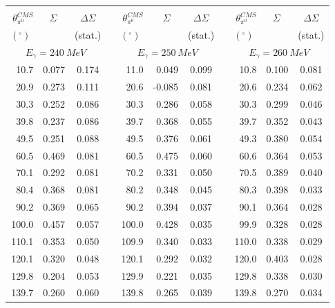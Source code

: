 \begin{table}[htbp] 
\begin{center} 
\begin{tabular}{|r|r|c|l|r|r|c|l|r|r|c|} 

\cline{1-3} 
\cline{5-7} 
\cline{9-11} 
& & & & & & & & & &\\ 
$\theta_{\pi^0}^{CMS}$ & 
$\Sigma\;\;\;$ & 
${\Delta}\Sigma$ & & 
$\theta_{\pi^0}^{CMS}$ & 
$\Sigma\;\;\;$ & 
${\Delta}\Sigma$ & & 
$\theta_{\pi^0}^{CMS}$ & 
$\Sigma\;\;\;$ & 
${\Delta}\Sigma$ \\ 
 $(^{\circ})\;$ & &(stat.) & & $(^{\circ})\;$ & &(stat.) & & $(^{\circ})\;$ & &(stat.) \\ 
\cline{1-3} 
\cline{5-7} 
\cline{9-11} 
\multicolumn{3}{|c|}{ $E_{\gamma}=240~MeV$} & & 
\multicolumn{3}{c|}{ $E_{\gamma}=250~MeV$} & & 
\multicolumn{3}{c|}{ $E_{\gamma}=260~MeV$} \\ 
\cline{1-3} 
\cline{5-7} 
\cline{9-11} 
 10.7 & 0.077 & 0.174 & &  11.0 & 0.049 & 0.099 & &  10.8 & 0.100 & 0.081 \\ 
 20.9 & 0.273 & 0.111 & &  20.6 & -0.085 & 0.081 & &  20.6 & 0.234 & 0.062 \\ 
 30.3 & 0.252 & 0.086 & &  30.3 & 0.286 & 0.058 & &  30.3 & 0.299 & 0.046 \\ 
 39.8 & 0.237 & 0.086 & &  39.7 & 0.368 & 0.055 & &  39.7 & 0.352 & 0.043 \\ 
 49.5 & 0.251 & 0.088 & &  49.5 & 0.376 & 0.061 & &  49.3 & 0.380 & 0.054 \\ 
 60.5 & 0.469 & 0.081 & &  60.5 & 0.475 & 0.060 & &  60.6 & 0.364 & 0.053 \\ 
 70.1 & 0.292 & 0.081 & &  70.2 & 0.331 & 0.050 & &  70.5 & 0.389 & 0.040 \\ 
 80.4 & 0.368 & 0.081 & &  80.2 & 0.348 & 0.045 & &  80.3 & 0.398 & 0.033 \\ 
 90.2 & 0.369 & 0.065 & &  90.2 & 0.394 & 0.037 & &  90.1 & 0.364 & 0.028 \\ 
100.0 & 0.457 & 0.057 & & 100.0 & 0.428 & 0.035 & &  99.9 & 0.328 & 0.028 \\ 
110.1 & 0.353 & 0.050 & & 109.9 & 0.340 & 0.033 & & 110.0 & 0.338 & 0.029 \\ 
120.1 & 0.320 & 0.048 & & 120.1 & 0.292 & 0.032 & & 120.0 & 0.403 & 0.028 \\ 
129.8 & 0.204 & 0.053 & & 129.9 & 0.221 & 0.035 & & 129.8 & 0.338 & 0.030 \\ 
139.7 & 0.260 & 0.060 & & 139.8 & 0.265 & 0.039 & & 139.8 & 0.270 & 0.034 \\ 

\end{tabular}
\end{center}
\end{table}
